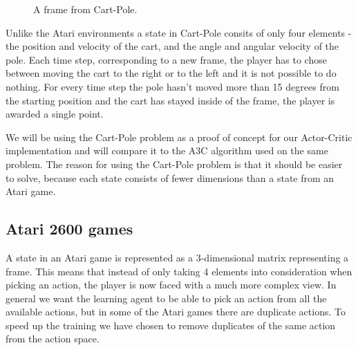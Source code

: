 \documentclass[11pt]{article}
\begin{document}
\begin{figure}[!h]
    \centering
    \caption{A frame from Cart-Pole.}
    \label{fig:cartpole}
\end{figure}

Unlike the Atari environments a state in Cart-Pole consits of only four elements - the position and velocity of the cart, and the
angle and angular velocity of the pole.
Each time step, corresponding to a new frame, the player has to chose between moving the cart to the right or to the left and it is not possible
to do nothing.
For every time step the pole hasn't moved more than 15 degrees from the starting position and
the cart has stayed inside of the frame, the player is awarded a single point.

We will be using the Cart-Pole problem as a proof of concept for our Actor-Critic implementation and will
compare it to the A3C algorithm used on the same problem.
The reason for using the Cart-Pole problem is that it should be easier
to solve, because each state consists of fewer dimensions than a state
from an Atari game.


\subsection{Atari 2600 games}

A state in an Atari game is represented as a 3-dimensional matrix representing a
frame.
This means that instead of only taking 4 elements into consideration when picking an action,
the player is now faced with a much more complex view. 
In general we want the learning agent to be able to pick an action from all
the available actions, but in some of the Atari games there are duplicate actions.
To speed up the training we have chosen to remove duplicates of the same action
from the action space.
\end{document}
